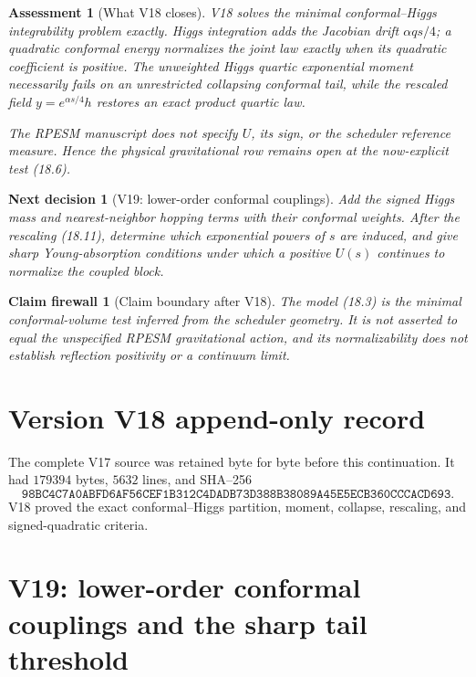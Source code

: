 \documentclass[11pt]{article}
\newtheorem{firewall}[theorem]{Claim firewall}
\newtheorem{decision}[theorem]{Next decision}
\newtheorem{assessment}[theorem]{Assessment}
\theoremstyle{remark}
\begin{document}
\begin{assessment}[What V18 closes]
\label{ass:v17v18-status}
V18 solves the minimal conformal--Higgs integrability problem
exactly.  Higgs integration adds the Jacobian drift
\(\alpha q s/4\); a quadratic conformal energy normalizes the joint
law exactly when its quadratic coefficient is positive.  The
unweighted Higgs quartic exponential moment necessarily fails on
an unrestricted collapsing conformal tail, while the rescaled
field \(y=e^{\alpha s/4}h\) restores an exact product quartic law.

The RPESM manuscript does not specify \(U\), its sign, or the
scheduler reference measure.  Hence the physical gravitational
row remains open at the now-explicit test (18.6).
\end{assessment}

\begin{decision}[V19: lower-order conformal couplings]
\label{dec:v17v18-next}
Add the signed Higgs mass and nearest-neighbor hopping terms with
their conformal weights.  After the rescaling (18.11), determine
which exponential powers of \(s\) are induced, and give sharp
Young-absorption conditions under which a positive \(U(s)\)
continues to normalize the coupled block.
\end{decision}

\begin{firewall}[Claim boundary after V18]
\label{fire:v17v18}
The model (18.3) is the minimal conformal-volume test inferred from
the scheduler geometry.  It is not asserted to equal the
unspecified RPESM gravitational action, and its normalizability does
not establish reflection positivity or a continuum limit.
\end{firewall}

\section*{Version V18 append-only record}
The complete V17 source was retained byte for byte before this
continuation.  It had \(179394\) bytes, \(5632\) lines, and SHA--256
\[
 \texttt{98BC4C7A0ABFD6AF56CEF1B312C4DADB73D388B38089A45E5ECB360CCCACD693}.
\]
V18 proved the exact conformal--Higgs partition, moment, collapse,
rescaling, and signed-quadratic criteria.


\section{V19: lower-order conformal couplings and the sharp tail threshold}
\label{sec:v17v19}
\end{document}
